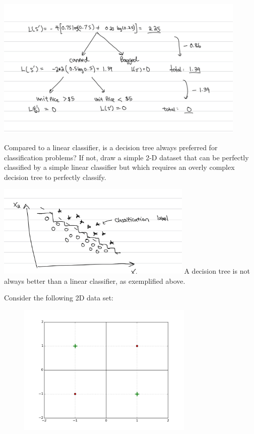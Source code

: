\begin{solution}
    \begin{center}
        \includegraphics[width=0.9\textwidth]{d4.jpeg}
    \end{center}

\end{solution}

\problem[4]
Compared to a linear classifier, is a decision tree always preferred for classification problems? If not, draw a simple 2-D dataset that can be perfectly classified by a simple linear classifier but which requires an overly complex decision tree to perfectly classify.

\begin{solution}
    \includegraphics[width=0.7\textwidth]{d2.jpeg}
    A decision tree is not always better than a linear classifier, as exemplified above.
\end{solution}

\problem[15]
Consider the following 2D data set:
\begin{figure}[H]
    \begin{center}
    \includegraphics[width=3.3in]{plots/3C.png}
    \end{center}
    \end{figure}

